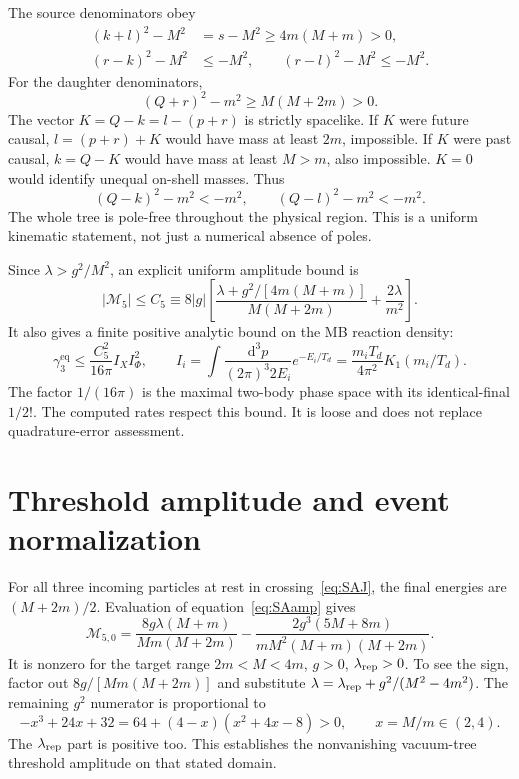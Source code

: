 \documentclass[11pt]{article}
\newcommand{\dd}{\mathrm d}
\newcommand{\eq}{\mathrm{eq}}
\begin{document}
The source denominators obey
\begin{align}
 (k+l)^2-M^2&=s-M^2\ge4m(M+m)>0,\\
 (r-k)^2-M^2&\le-M^2,\qquad
 (r-l)^2-M^2\le-M^2.
\end{align}
For the daughter denominators,
\begin{equation}
 (Q+r)^2-m^2\ge M(M+2m)>0.
\end{equation}
The vector $K=Q-k=l-(p+r)$ is strictly spacelike. If $K$ were future
causal, $l=(p+r)+K$ would have mass at least $2m$, impossible. If $K$
were past causal, $k=Q-K$ would have mass at least $M>m$, also impossible.
$K=0$ would identify unequal on-shell masses. Thus
\begin{equation}
 (Q-k)^2-m^2<-m^2,\qquad (Q-l)^2-m^2<-m^2.
\end{equation}
The whole tree is pole-free throughout the physical region. This is a
uniform kinematic statement, not just a numerical absence of poles.

Since $\lambda>g^2/M^2$, an explicit uniform amplitude bound is
\begin{equation}
 |\mathcal M_5|\le C_5\equiv8|g|
 \left[\frac{\lambda+g^2/[4m(M+m)]}{M(M+2m)}
 +\frac{2\lambda}{m^2}\right].
\end{equation}
It also gives a finite positive analytic bound on the MB reaction density:
\begin{equation}
 \gamma_3^\eq\le\frac{C_5^2}{16\pi}I_X I_\Phi^2,
 \qquad I_i=\int\frac{\dd^3p}{(2\pi)^3 2E_i}e^{-E_i/T_d}
 =\frac{m_iT_d}{4\pi^2}K_1(m_i/T_d).
\end{equation}
The factor $1/(16\pi)$ is the maximal two-body phase space with its
identical-final $1/2!$. The computed rates respect this bound. It is loose
and does not replace quadrature-error assessment.

\section{Threshold amplitude and event normalization}
For all three incoming particles at rest in crossing~\eqref{eq:SAJ},
the final energies are $(M+2m)/2$. Evaluation of equation~\eqref{eq:SAamp}
gives
\begin{equation}
 \mathcal M_{5,0}=
 \frac{8g\lambda(M+m)}{Mm(M+2m)}
 -\frac{2g^3(5M+8m)}{mM^2(M+m)(M+2m)}.
\end{equation}
It is nonzero for the target range $2m<M<4m$, $g>0$,
$\lambda_{\rm rep}>0$. To see the sign, factor out
$8g/[Mm(M+2m)]$ and substitute
$\lambda=\lambda_{\rm rep}+g^2/(M^2-4m^2)$.
The remaining $g^2$ numerator is proportional to
\begin{equation}
 -x^3+24x+32=64+(4-x)(x^2+4x-8)>0,\qquad x=M/m\in(2,4).
\end{equation}
The $\lambda_{\rm rep}$ part is positive too. This establishes the
nonvanishing vacuum-tree threshold amplitude on that stated domain.
\end{document}
